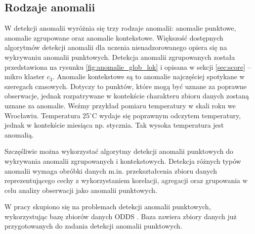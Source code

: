 \subsection{Rodzaje anomalii}
W detekcji anomalii wyróżnia się trzy rodzaje anomalii: anomalie punktowe, anomalie zgrupowane oraz anomalie kontekstowe.
Większość dostępnych algorytmów detekcji anomalii dla uczenia nienadzorowanego opiera się na wykrywaniu anomalii punktowych. Detekcja anomalii zgrupowanych została przedstawiona na rysunku \ref{fig:anomalie_glob_lok} i opisana w sekcji \ref{sec:score} -- mikro klaster $c_3$.
Anomalie kontekstowe są to anomalie najczęściej spotykane w szeregach czasowych. Dotyczy to punktów, które mogą być uznane za poprawne obserwacje, jednak rozpatrywane w kontekście charakteru zbioru danych zostaną uznane za anomalie. Weźmy przykład pomiaru temperatury w skali roku we Wrocławiu. Temperatura 25$^{\circ}$C wydaje się poprawnym odczytem temperatury, jednak w kontekście miesiąca np. stycznia. Tak wysoka temperatura jest anomalią.

Szczęśliwie można wykorzystać algorytmy detekcji anomalii punktowych do wykrywania anomalii zgrupowanych i kontekstowych. 
Detekcja różnych typów anomalii wymaga obróbki danych m.in. przekształcenia zbioru danych reprezentującego cechy z wykorzystaniem korelacji, agregacji oraz grupowania \cite{goldstein2014behavior} w celu analizy obserwacji jako anomalii punktowych.

W pracy skupiono się na problemach detekcji anomalii punktowych, wykorzystując bazę zbiorów danych ODDS \cite{ODDS}. Baza zawiera zbiory danych już przygotowanych do zadania detekcji anomalii punktowych.


